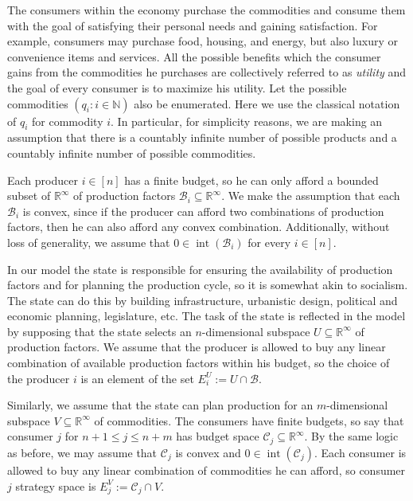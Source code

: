 \documentclass[a4paper,11pt,reqno,english]{amsart}
\theoremstyle{plain}
\theoremstyle{definition}
\begin{document}
The consumers within the economy purchase the commodities and consume them with the goal of satisfying their personal needs and gaining satisfaction. For example, consumers may purchase food, housing, and energy, but also luxury or convenience items and services. All the possible benefits which the consumer gains from the commodities he purchases are collectively referred to as \textit{utility} and the goal of every consumer is to maximize his utility. 
Let the possible commodities $(q_i :i\in\mathbb{N})$ also be enumerated. Here we use the classical notation of $q_i$ for commodity $i$.
In particular, for simplicity reasons, we are making an assumption that there is a countably infinite number of possible products and a countably infinite number of possible commodities.

\medskip
Each producer $i\in[n]$ has a finite budget, so he can only afford a bounded subset of $\mathbb{R}^{\infty}$ of production factors $\mathcal{B}_i\subseteq\mathbb{R}^{\infty}$.
We make the assumption that each $\mathcal{B}_i$ is convex, since if the producer can afford two combinations of production factors, then he can also afford any convex combination.
Additionally, without loss of generality, we assume that $0\in \operatorname{int}(\mathcal{B}_i)$ for every $i\in[n]$.

\medskip
In our model the state is responsible for ensuring the availability of production factors and for planning the production cycle, so it is somewhat akin to socialism. The state can do this by building infrastructure, urbanistic design, political and economic planning, legislature, etc.
The task of the state is reflected in the model by supposing that the state selects an $n$-dimensional subspace $U\subseteq \mathbb{R}^{\infty}$ of production factors.
We assume that the producer is allowed to buy any linear combination of available production factors within his budget, so the choice of the producer $i$ is an element of the set $E_i^U:=U\cap\mathcal{B}$.

\medskip
Similarly, we assume that the state can plan production for an $m$-dimensional subspace $V\subseteq\mathbb{R}^{\infty}$ of commodities.
The consumers have finite budgets, so say that consumer $j$ for $n+1\leq j\leq n+m$ has budget space $\mathcal{C}_j\subseteq\mathbb{R}^{\infty}$.
By the same logic as before, we may assume that $\mathcal{C}_j$ is convex and  $0\in \operatorname{int}(\mathcal{C}_j)$.
Each consumer is allowed to buy any linear combination of commodities he can afford, so consumer $j$ strategy space is $E_j^V:=\mathcal{C}_j\cap V$.
\end{document}
